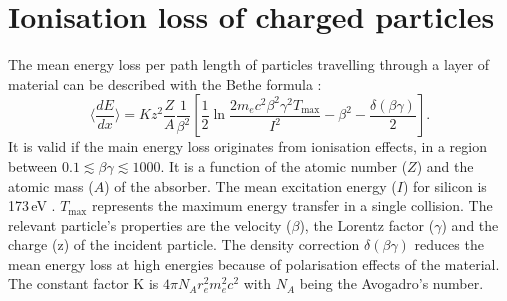 \section{Ionisation loss of charged particles}
\label{sec:sub:MeasuringDeDx}
The mean energy loss per path length of particles travelling through a layer of material can be described with the Bethe formula \cite{bib:Bethe_1930}:
\begin{equation*}
\langle \frac{dE}{dx} \rangle = Kz^2\frac{Z}{A}\frac{1}{\beta^2} [ \frac{1}{2} \ln{\frac{2m_e c^2 \beta^2 \gamma^2 T_{\text{max}}}{I^2}} - \beta^2 - \frac{\delta( \beta \gamma )}{2} ].
\end{equation*}
It is valid if the main energy loss originates from ionisation effects, \ie in a region between $0.1\lesssim\beta\gamma\lesssim 1000$.
It is a function of the atomic number ($Z$) and the atomic mass ($A$) of the absorber. 
The mean excitation energy ($I$) for silicon is 173\,eV \cite{bib:NIST}. 
$T_{\text{max}}$ represents the maximum energy transfer in a single collision.
The relevant particle's properties are the velocity ($\beta$), the Lorentz factor ($\gamma$) and the charge (z) of the incident particle.
The density correction $\delta( \beta \gamma )$ reduces the mean energy loss at high energies because of polarisation effects of the material. 
The constant factor K is $4\pi N_A r_e^2 m_e^2 c^2$ with $N_A$ being the Avogadro’s number.


